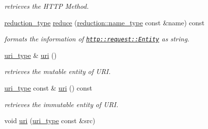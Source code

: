 \begin{DoxyCompactItemize}
\begin{DoxyCompactList}\small\item\em retrieves the H\-T\-T\-P Method. \end{DoxyCompactList}\item 
\hypertarget{classhryky_1_1http_1_1request_1_1_entity_aa7485531769ff56b03ebb379c614e8f4}{\hyperlink{namespacehryky_a343a9a4c36a586be5c2693156200eadc}{reduction\-\_\-type} \hyperlink{classhryky_1_1http_1_1request_1_1_entity_aa7485531769ff56b03ebb379c614e8f4}{reduce} (\hyperlink{namespacehryky_1_1reduction_ac686c30a4c8d196bbd0f05629a6b921f}{reduction\-::name\-\_\-type} const \&name) const }\label{classhryky_1_1http_1_1request_1_1_entity_aa7485531769ff56b03ebb379c614e8f4}

\begin{DoxyCompactList}\small\item\em formats the information of \href{http::request::Entity}{\tt http\-::request\-::\-Entity} as string. \end{DoxyCompactList}\item 
\hypertarget{classhryky_1_1http_1_1request_1_1_entity_aec1560dbd6bd5a192a20b4f0905a846d}{\hyperlink{classhryky_1_1uri_1_1_entity}{uri\-\_\-type} \& \hyperlink{classhryky_1_1http_1_1request_1_1_entity_aec1560dbd6bd5a192a20b4f0905a846d}{uri} ()}\label{classhryky_1_1http_1_1request_1_1_entity_aec1560dbd6bd5a192a20b4f0905a846d}

\begin{DoxyCompactList}\small\item\em retrieves the mutable entity of U\-R\-I. \end{DoxyCompactList}\item 
\hypertarget{classhryky_1_1http_1_1request_1_1_entity_a8b41c64bd22204fe734e6cfe69f9319f}{\hyperlink{classhryky_1_1uri_1_1_entity}{uri\-\_\-type} const \& \hyperlink{classhryky_1_1http_1_1request_1_1_entity_a8b41c64bd22204fe734e6cfe69f9319f}{uri} () const }\label{classhryky_1_1http_1_1request_1_1_entity_a8b41c64bd22204fe734e6cfe69f9319f}

\begin{DoxyCompactList}\small\item\em retrieves the immutable entity of U\-R\-I. \end{DoxyCompactList}\item 
\hypertarget{classhryky_1_1http_1_1request_1_1_entity_a2e12773d2784b7f058db9ce957e4cfde}{void \hyperlink{classhryky_1_1http_1_1request_1_1_entity_a2e12773d2784b7f058db9ce957e4cfde}{uri} (\hyperlink{classhryky_1_1uri_1_1_entity}{uri\-\_\-type} const \&src)}\label{classhryky_1_1http_1_1request_1_1_entity_a2e12773d2784b7f058db9ce957e4cfde}


\end{DoxyCompactItemize}
